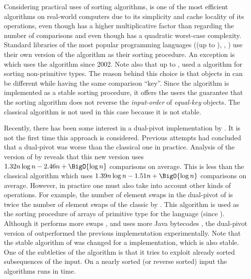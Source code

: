 Considering practical uses of sorting algorithms, \quicksort is one of the most
efficient algorithms on real-world computers due to its simplicity and cache
locality of its operations, even though \quicksort has a higher
multiplicative factor than \mergesort regarding the number of
comparisons and even though \quicksort has a quadratic worst-case complexity. Standard libraries of the most
popular programming languages (\Java (up to ), \CC, \CXX) use their own
version of the \quicksort algorithm as their sorting procedure. An exception is
\Python which uses the \timsort algorithm since 2002. Note also that up to , \Java used a \mergesort algorithm for sorting non-primitive types. The
reason behind this choice is that objects in \Java can be different while
having the same comparison ``key''. Since the \Java \mergesort algorithm is
implemented as a stable sorting procedure, it offers the users the guarantee
that the sorting algorithm does not reverse the \emph{input-order} of
\emph{equal-key} objects.
The classical \quicksort algorithm is not used in this case because it is not
stable.

Recently, there has been some interest in a dual-pivot \quicksort
implementation by \citet*{yaroslavskiy:2009}. It is not the first time this
approach is considered. Previous attempts \cite{sedgewick:1980} had concluded
that a dual-pivot \quicksort was worse than the classical one in practice.
Analysis of the version of \citet*{yaroslavskiy:2009} by \citet*{wild:2012}
reveals that this new version uses \(1.32n \log n - 2.46n + \BigO{\log n}\)
comparisons on average. This is less than the classical \quicksort algorithm which uses
\(1.39n \log n - 1.51n + \BigO{\log n}\) comparisons on average. However, in practice one must also take into account
other kinds of operations. For example, the number of element swaps in the
dual-pivot \quicksort of \citeauthor{yaroslavskiy:2009} is twice the number of
element swaps of the classic \quicksort by \citeauthor{hoare:1962}. This
algorithm is used as the sorting procedure of arrays of primitive type for
the \Java language (since ). Although it performs more
swaps \cite{wild:2012}, and uses more Java bytecodes \cite{wild:2013}, the
dual-pivot version of \citet*{yaroslavskiy:2009} outperformed the previous
\quicksort implementation experimentally. Note that the stable \mergesort
algorithm of  was changed for a \timsort implementation, which is
also stable. One of the subtleties of the \timsort algorithm is that it tries
to exploit already sorted subsequences of the input. On a nearly sorted (or
reverse sorted) input the \timsort algorithms runs in  time.


